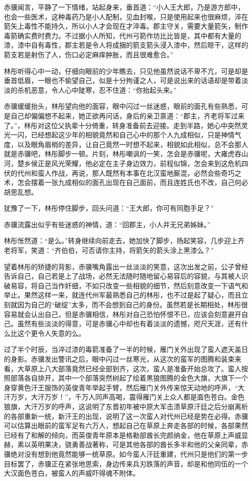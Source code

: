 赤骥闻言，平静了一下情绪，站起身来，垂首道：“小人王大郎，乃是游方郎中，也会一些医术，这种毒药乃是小人配制，见血封喉，只是使用起来也很麻烦，淬在箭矢上毒性不能持久，所以小人才会现在才淬毒。郡主守关，需要大量箭矢，制作毒箭确实费时费力。不过据小人所知，代州弓箭作坊比比皆是，其中都有大量的漆，漆中自有毒性，郡主若是令人将成捆的箭支箭头浸入漆中，然后晾干，这样的箭支若是射伤了人，伤口必定麻痒肿胀，而且很难愈合。”

林彤听得心中一动，仔细向眼前的少年瞧去，只见他虽然说话不卑不亢，可是却是垂首低眉，一眼也不偷望自己，似是十分拘谨之人，可是说出来的话语却是带着淡淡的杀机恶意，令人心中陡寒，忍不住道：“你抬起头来。”

赤骥缓缓抬头，林彤望向他的面容，眼中闪过一丝迷惑，眼前的面孔有些熟悉，可是自己却偏偏想不起来，她正欲再问话，身后的亲卫禀道：“郡主，齐老将军过来了。”，林彤对这位父执辈十分倚重，转身准备前去迎接。走到半路，她心中突然灵光一闪，已经想起这少年的相貌竟然和自己心中的那个人九成相似，只是神情气度，以及眼角眉梢的差异，让自己竟然一时想不起来，相貌如此相似，总不会那人就是赤骥吧，林彤脚步一顿。片刻，林彤嘲讽的一笑，怎会是赤骥呢，大雍虎吞山河，楚乡侯正是风光荣耀，他必定在主子身边效力，前程似锦，怎会来到这危机四伏的代州和蛮人作战，再说，那人既然有本事在北汉蛮地厮混，必然会些奇巧之术，怎会摆着一张九成相似的面孔出现在自己面前，而且连姓氏也不改，自己何必胡思乱想。

犹豫了一下，林彤停住脚步，回头问道：“王大郎，你可有同胞手足？”

赤骥流露出似乎有些迷惑的神情，道：“回郡主，小人并无兄弟姊妹。”

林彤怅然道：“是么。”转身继续向前走去，她加快了脚步，扬起笑容，几步迎上齐老将军，笑道：“齐伯伯，可否请你主持，将箭矢的箭头涂上黑漆么？”

望着林彤的矫捷的背影，赤骥嘴角露出一丝淡淡的笑意，这次出发之前，公子曾经告诉自己，自己若是上了战场，必然无法随时随地留心易容后的容貌，与其被人识破易容，将自己当作奸细，不如只改变一些相貌的细节，然后刻意改变一下语气和举止。果然这样一来，就连代州军最熟悉自己的林彤，也不过是起了疑心，而且立刻就因为自己的“破绽”太多，而不会想到自己的身份。虽然若是长期相处，林彤很容易就会认出自己，但是赤骥相信，林彤对自己恐怕怀恨不已，应该会刻意避开自己。虽然有些淡淡的得意，可是赤骥心中却也有着淡淡的遗憾，咫尺天涯，还有什么比这个更令人失意的么。

过了半个时辰，当淬过漆的毒箭准备了一半的时候，雁门关外出现了蛮人遮天盖日的身影。赤骥发出警讯之后，眼中闪过一丝寒光，从这次的蛮军的图腾和装束来看，大草原上八大部落竟然已经全部到齐，这次，蛮人是准备开始总攻了。蛮人按照部落各自排开，其中一个部落突然树起了绘着黒狼图腾的金色大旗，大旗下一个身穿黄色汗王服饰的英俊青年举起手臂，然后雁门关外传来惊天动地的呼声，“大汗万岁，大汗万岁！”，千万人同声高喝，震得雁门关上众人都是面色苍白。金色狼旗，大汗万岁的呼声，这说明了东晋初年被中原大军击溃草原汗廷之后分崩离析的各部重新一统，新汗王的出现，说明了这一次蛮人对代州已经是势在必得。赤骥可以估算出眼前的蛮军足有六万人，想起自己在草原上奔走各部的时候，各部果然已经有了和解的倾向，而英俊青年原本是格勒部酋长完颜纳金，他在草原上声威显赫，素以英明果决，骁勇善战著称，可是其他各部的酋长多半和他的父亲同辈，赤骥绝对没有想到他竟然能够一统草原。如今蛮人汗廷重建，代州只是他们的第一步目标罢了，赤骥正在紧张地思索，身边传来兵刃跌落的声音，却是和他同伍的一个大汉面色苍白，被蛮人的声威吓得魂不附体。

